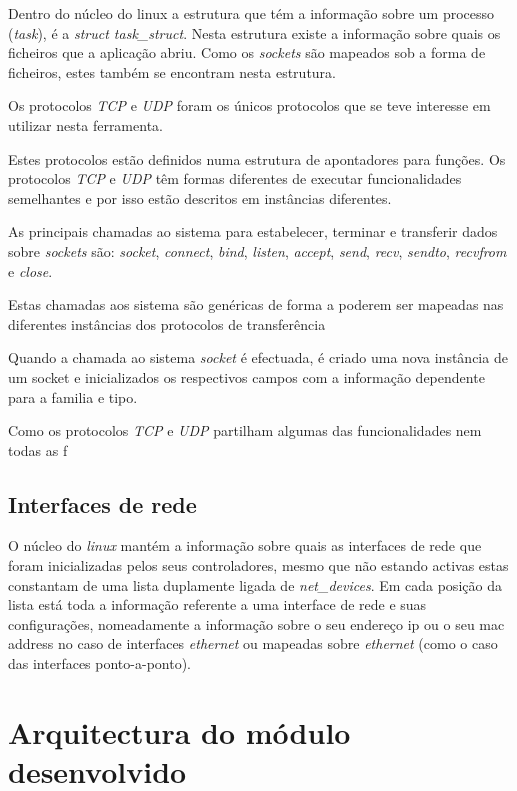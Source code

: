 Dentro do núcleo do linux a estrutura que tém a informação sobre um processo
(\textit{task}), é a \textit{struct task\_struct}. Nesta estrutura existe a
informação sobre quais os ficheiros que a aplicação abriu. Como os
\textit{sockets} são mapeados sob a forma de ficheiros, estes também se
encontram nesta estrutura.

Os protocolos \textit{TCP} e \textit{UDP} foram os únicos protocolos que se teve
interesse em utilizar nesta ferramenta.

Estes protocolos estão definidos numa estrutura de apontadores para funções.
Os protocolos \textit{TCP} e \textit{UDP} têm formas diferentes de executar
funcionalidades semelhantes e por isso estão descritos em instâncias diferentes.

As principais chamadas ao sistema para estabelecer, terminar e transferir dados
sobre \textit{sockets} são: \textit{socket}, \textit{connect}, \textit{bind},
\textit{listen}, \textit{accept}, \textit{send}, \textit{recv}, \textit{sendto},
\textit{recvfrom} e \textit{close}. 

Estas chamadas aos sistema são genéricas de forma a poderem ser mapeadas nas
diferentes instâncias dos protocolos de transferência

Quando a chamada ao sistema \textit{socket} é efectuada, é criado uma nova
instância de um socket e inicializados os respectivos campos com a informação
dependente para a familia e tipo. 


Como os protocolos \textit{TCP} e \textit{UDP} partilham algumas das
funcionalidades nem todas as f

\subsection{Interfaces de rede}

O núcleo do \textit{linux} mantém a informação sobre quais as interfaces de
rede que foram inicializadas pelos seus controladores, mesmo que não estando
activas estas constantam de uma lista duplamente ligada de
\textit{net\_devices}. Em cada posição da lista está toda a informação
referente a uma interface de rede e suas configurações, nomeadamente a
informação sobre o seu endereço ip ou o seu mac address no caso de interfaces
\textit{ethernet} ou mapeadas sobre \textit{ethernet} (como o caso das
interfaces ponto-a-ponto).


\section{Arquitectura do módulo desenvolvido}

